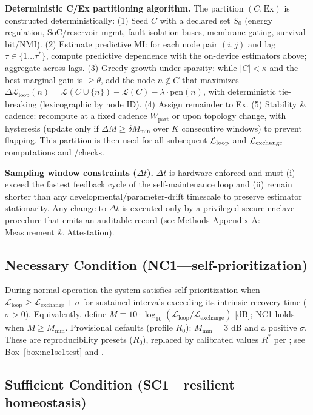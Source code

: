 \documentclass[11pt]{article}
\begin{document}
\textbf{Deterministic C/Ex partitioning algorithm.} The partition $(C, \text{Ex})$ is constructed deterministically: (1) Seed $C$ with a declared set $S_0$ (energy regulation, SoC/reservoir mgmt, fault-isolation buses, membrane gating, survival-bit/NMI). (2) Estimate predictive MI: for each node pair $(i,j)$ and lag $\tau \in \{1 \ldots \tau^*\}$, compute predictive dependence with the on-device estimators above; aggregate across lags. (3) Greedy growth under sparsity: while $|C| < \kappa$ and the best marginal gain is $\geq \theta$, add the node $n \notin C$ that maximizes $\Delta\mathcal{L}_{\text{loop}}(n) = \mathcal{L}(C \cup \{n\}) - \mathcal{L}(C) - \lambda \cdot \text{pen}(n)$, with deterministic tie-breaking (lexicographic by node ID). (4) Assign remainder to Ex. (5) Stability \& cadence: recompute at a fixed cadence $W_{\text{part}}$ or upon topology change, with hysteresis (update only if $\Delta M \geq \delta M_{\min}$ over $K$ consecutive windows) to prevent flapping. This partition is then used for all subsequent $\mathcal{L}_{\text{loop}}$ and $\mathcal{L}_{\text{exchange}}$ computations and \NC/\SC checks.

\textbf{Sampling window constraints ($\Delta t$).} $\Delta t$ is hardware-enforced and must (i) exceed the fastest feedback cycle of the self-maintenance loop and (ii) remain shorter than any developmental/parameter-drift timescale to preserve estimator stationarity. Any change to $\Delta t$ is executed only by a privileged secure-enclave procedure that emits an auditable record (see Methods Appendix A: Measurement \& Attestation).

\subsection{Necessary Condition (NC1---self-prioritization)}
\label{sec:nc1}

During normal operation the system satisfies self-prioritization when $\mathcal{L}_{\text{loop}} \geq \mathcal{L}_{\text{exchange}} + \sigma$ for sustained intervals exceeding its intrinsic recovery time ($\sigma > 0$). Equivalently, define $M \equiv 10 \cdot \log_{10}(\mathcal{L}_{\text{loop}}/\mathcal{L}_{\text{exchange}})$ [dB]; NC1 holds when $M \geq M_{\min}$. Provisional defaults (profile $R_0$): $M_{\min} = 3$ dB and a positive $\sigma$. These are reproducibility presets ($R_0$), replaced by calibrated values $R^*$ per ; see Box~\ref{box:nc1sc1test} and .

\subsection{Sufficient Condition (SC1---resilient homeostasis)}
\label{sec:sc1}
\end{document}
